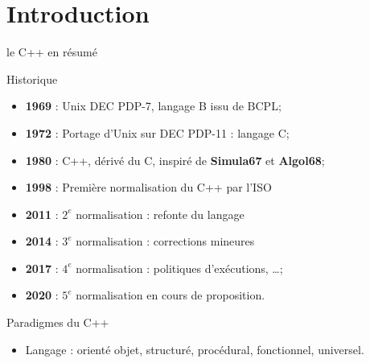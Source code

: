\documentclass[handout,10pt]{beamer}
\begin{document}
\section{Introduction}

\begin{frame}[fragile]{le C++ en résumé}
\tiny
\begin{block}{Historique}
\begin{itemize}
  \item \textbf{1969} : Unix DEC PDP-7, langage B issu de BCPL;
  \item \textbf{1972} : Portage d'Unix sur DEC PDP-11 : langage C;
  \item \textbf{1980} :  C++, dérivé du C, inspiré de \textbf{Simula67} et \textbf{Algol68};
  \item \textbf{1998} : Première normalisation du C++ par l'ISO
  \item \textbf{2011} : $2^{e}$ normalisation  : refonte du langage
  \item \textbf{2014} : $3^{e}$ normalisation  : corrections mineures
  \item \textbf{2017} : $4^{e}$ normalisation  : politiques d'exécutions, \ldots;
  \item \textbf{2020} : $5^{e}$ normalisation en cours de proposition.
\end{itemize}
\end{block}

\begin{block}{Paradigmes du C++}
\begin{itemize}
 \item Langage : orienté objet, structuré, procédural, fonctionnel, universel.
\end{itemize}
\end{block}
\end{frame}
\end{document}
